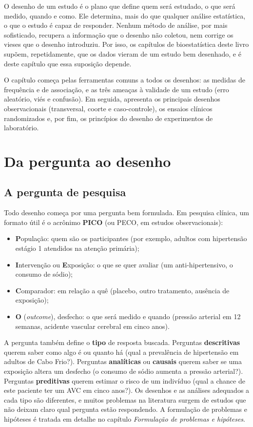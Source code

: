 \documentclass[
]{book}
\providecommand{\tightlist}{%
  \setlength{\itemsep}{0pt}\setlength{\parskip}{0pt}}
\begin{document}
O desenho de um estudo é o plano que define quem será estudado, o que será medido, quando e como. Ele determina, mais do que qualquer análise estatística, o que o estudo é capaz de responder. Nenhum método de análise, por mais sofisticado, recupera a informação que o desenho não coletou, nem corrige os vieses que o desenho introduziu. Por isso, os capítulos de bioestatística deste livro supõem, repetidamente, que os dados vieram de um estudo bem desenhado, e é deste capítulo que essa suposição depende.

O capítulo começa pelas ferramentas comuns a todos os desenhos: as medidas de frequência e de associação, e as três ameaças à validade de um estudo (erro aleatório, viés e confusão). Em seguida, apresenta os principais desenhos observacionais (transversal, coorte e caso-controle), os ensaios clínicos randomizados e, por fim, os princípios do desenho de experimentos de laboratório.

\section{Da pergunta ao desenho}\label{da-pergunta-ao-desenho}

\subsection{A pergunta de pesquisa}\label{a-pergunta-de-pesquisa}

Todo desenho começa por uma pergunta bem formulada. Em pesquisa clínica, um formato útil é o acrônimo \textbf{PICO} (ou PECO, em estudos observacionais):

\begin{itemize}
\tightlist
\item
  \textbf{P}opulação: quem são os participantes (por exemplo, adultos com hipertensão estágio 1 atendidos na atenção primária);
\item
  \textbf{I}ntervenção ou \textbf{E}xposição: o que se quer avaliar (um anti-hipertensivo, o consumo de sódio);
\item
  \textbf{C}omparador: em relação a quê (placebo, outro tratamento, ausência de exposição);
\item
  \textbf{O} (\emph{outcome}), desfecho: o que será medido e quando (pressão arterial em 12 semanas, acidente vascular cerebral em cinco anos).
\end{itemize}

A pergunta também define o \textbf{tipo} de resposta buscada. Perguntas \textbf{descritivas} querem saber como algo é ou quanto há (qual a prevalência de hipertensão em adultos de Cabo Frio?). Perguntas \textbf{analíticas} ou \textbf{causais} querem saber se uma exposição altera um desfecho (o consumo de sódio aumenta a pressão arterial?). Perguntas \textbf{preditivas} querem estimar o risco de um indivíduo (qual a chance de este paciente ter um AVC em cinco anos?). Os desenhos e as análises adequados a cada tipo são diferentes, e muitos problemas na literatura surgem de estudos que não deixam claro qual pergunta estão respondendo. A formulação de problemas e hipóteses é tratada em detalhe no capítulo \emph{Formulação de problemas e hipóteses}.
\end{document}
